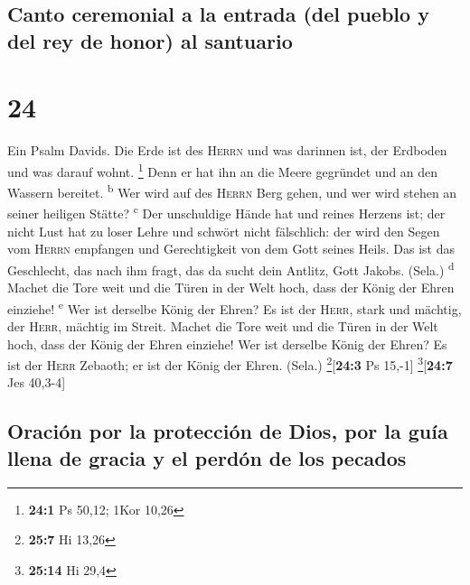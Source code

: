 \hypertarget{canto-ceremonial-a-la-entrada-del-pueblo-y-del-rey-de-honor-al-santuario}{%
\subsection{Canto ceremonial a la entrada (del pueblo y del rey de
honor) al
santuario}\label{canto-ceremonial-a-la-entrada-del-pueblo-y-del-rey-de-honor-al-santuario}}

\hypertarget{section-23}{%
\section{24}\label{section-23}}

 Ein Psalm Davids. Die Erde ist des \textsc{Herrn} und was
darinnen ist, der Erdboden und was darauf wohnt. \footnote{\textbf{24:1}
  Ps 50,12; 1Kor 10,26}  Denn er hat ihn an die Meere
gegründet und an den Wassern bereitet. \textsuperscript{b}
 Wer wird auf des \textsc{Herrn} Berg gehen, und wer wird
stehen an seiner heiligen Stätte? \textsuperscript{c}  Der
unschuldige Hände hat und reines Herzens ist; der nicht Lust hat zu
loser Lehre und schwört nicht fälschlich:  der wird den
Segen vom \textsc{Herrn} empfangen und Gerechtigkeit von dem Gott seines
Heils.  Das ist das Geschlecht, das nach ihm fragt, das da
sucht dein Antlitz, Gott Jakobs. (Sela.) \textsuperscript{d}
 Machet die Tore weit und die Türen in der Welt hoch, dass
der König der Ehren einziehe! \textsuperscript{e}  Wer ist
derselbe König der Ehren? Es ist der \textsc{Herr}, stark und mächtig,
der \textsc{Herr}, mächtig im Streit.  Machet die Tore
weit und die Türen in der Welt hoch, dass der König der Ehren einziehe!
 Wer ist derselbe König der Ehren? Es ist der
\textsc{Herr} Zebaoth; er ist der König der Ehren. (Sela.)
\footnote{\textbf{25:7} Hi 13,26}{[}\textbf{24:3} Ps 15,-1{]}
\footnote{\textbf{25:14} Hi 29,4}{[}\textbf{24:7} Jes 40,3-4{]}

\hypertarget{oraciuxf3n-por-la-protecciuxf3n-de-dios-por-la-guuxeda-llena-de-gracia-y-el-perduxf3n-de-los-pecados}{%
\subsection{Oración por la protección de Dios, por la guía llena de
gracia y el perdón de los
pecados}\label{oraciuxf3n-por-la-protecciuxf3n-de-dios-por-la-guuxeda-llena-de-gracia-y-el-perduxf3n-de-los-pecados}}

